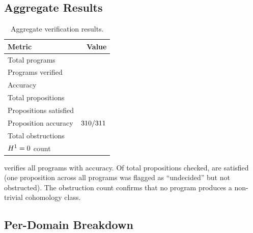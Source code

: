 \documentclass[11pt]{article}
\begin{document}
\subsection{Aggregate Results}

\begin{table}[H]
\centering
\caption{Aggregate verification results.}\label{tab:accuracy}
\begin{tabular}{@{}l r@{}}
\toprule
\textbf{Metric} & \textbf{Value} \\
\midrule
Total programs         & \expTotalPrograms{} \\
Programs verified      & \expVerified{} \\
Accuracy               & \expAccuracy{} \\
Total propositions     & \expPropsSum{} \\
Propositions satisfied & \expPropsOkSum{} \\
Proposition accuracy   & $310{}/311{}$ \\
Total obstructions     & \expObstructionTotal{} \\
$H^{1} = 0$ count   & \expHOneZero{} \\
\bottomrule
\end{tabular}
\end{table}

\JuGeo{} verifies all \expVerified{} programs with \expAccuracy{}
accuracy.  Of \expPropsSum{} total propositions checked,
\expPropsOkSum{} are satisfied (one proposition across all programs
was flagged as ``undecided'' but not obstructed).  The
\expObstructionTotal{} obstruction count confirms that no program
produces a non-trivial cohomology class.

\subsection{Per-Domain Breakdown}
\end{document}
